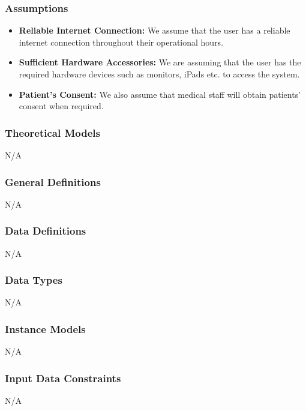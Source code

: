 \documentclass[12pt]{article}
\newcounter{assumpnum} %
\begin{document}
\subsubsection{Assumptions} \label{sec_assumpt}

\begin{itemize}
  \item[A\refstepcounter{assumpnum}\theassumpnum \label{A_reliableInternet}:] \textbf{Reliable Internet Connection:} We assume that the user has a reliable internet connection throughout their operational hours.
  \item[A\refstepcounter{assumpnum}\theassumpnum \label{A_sufficientHardware}:] \textbf{Sufficient Hardware Accessories:} We are assuming that the user has the required hardware devices such as monitors, iPads etc. to access the system.
  \item[A\refstepcounter{assumpnum}\theassumpnum \label{A_patientConsent}:] \textbf{Patient's Consent:} We also assume that medical staff will obtain patients' consent when required.  
\end{itemize}


\subsubsection{Theoretical Models}\label{sec_theoretical}
N/A

\subsubsection{General Definitions} \label{sec_GeneralDefinitions}
N/A

\subsubsection{Data Definitions}\label{sec_DataDefinitions} 
N/A

\subsubsection{Data Types}\label{sec_DataTypes}
N/A

\subsubsection{Instance Models} \label{sec_InstanceModels} 
N/A

\subsubsection{Input Data Constraints} \label{sec_InputDataConstraints}
N/A
\end{document}
